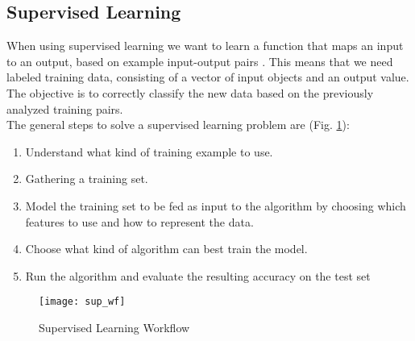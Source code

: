 \subsection{Supervised Learning} \label{supervised}
When using supervised learning we want to learn a function that maps an input to an output, based on example input-output pairs \cite{ai_sup}. This means that we need labeled training data, consisting of a vector of input objects and an output value. The objective is to correctly classify the new data based on the previously analyzed training pairs. \\

The general steps to solve a supervised learning problem are (Fig. \ref{fig:sup_wf}):
\begin{enumerate}[noitemsep]
	\item Understand what kind of training example to use.
	\item Gathering a training set.
	\item Model the training set to be fed as input to the algorithm by choosing which features to use and how to represent the data.
	\item Choose what kind of algorithm can best train the model.
	\item Run the algorithm and evaluate the resulting accuracy on the test set 
\end{enumerate}

\begin{figure}[H]
	\centering
	\texttt{[image: sup\_wf]}
	\caption{Supervised Learning Workflow \cite{sup_wf}}
	\label{fig:sup_wf}
\end{figure}

